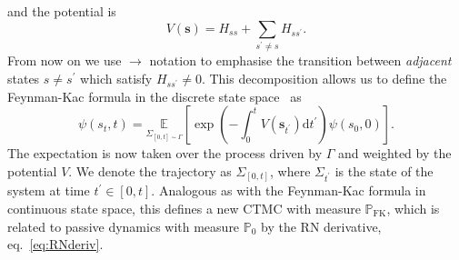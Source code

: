 and the potential is
\begin{equation}
V(\boldsymbol{s})=H_{s s}+\sum_{s^{\prime} \neq s} H_{s s^{\prime}}.
\end{equation}
From now on we use $\rightarrow$ notation to emphasise the transition between \emph{adjacent} states $s\neq s^\prime$ which satisfy $H_{s s^{\prime}} \neq 0$. This decomposition allows us to define the Feynman-Kac formula in the discrete state space~\cite{rogers2000diffusions} as
\begin{equation}
	\psi\left(s_t, t\right)=
	\underset{\Sigma_{[0, t] \sim \Gamma}}{\mathbb{E}}
	\left[
	\exp \left(-\int_{0}^{t} V\left(\boldsymbol{s}_{t^{\prime}}\right) \mathrm{d} t^{\prime}\right) \psi\left(s_0, 0\right)
	\right].
\end{equation}
The expectation is now taken over the process driven by $\Gamma$ and weighted by the potential $V$. We denote the trajectory as $\Sigma_{[0, t]}$, where $\Sigma_{t^\prime}$ is the state of the system at time $t^\prime \in [0, t]$. Analogous as with the Feynman-Kac formula in continuous state space, this defines a new CTMC with measure $\mathbb{P}_{\text{FK}}$, which is related to  passive dynamics with measure $\mathbb{P}_0$ by the RN derivative, eq.~\eqref{eq:RNderiv}.

